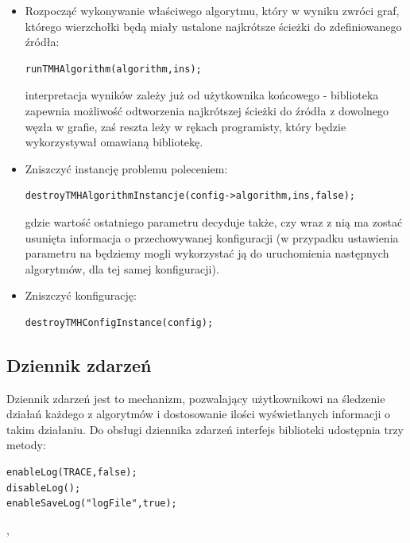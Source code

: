 \begin{itemize}
\item Rozpocząć wykonywanie właściwego algorytmu, który w wyniku zwróci graf, którego wierzchołki będą miały ustalone najkrótsze ścieżki do zdefiniowanego źródła:
\begin{lstlisting}[style=customc]
runTMHAlgorithm(algorithm,ins);
\end{lstlisting}
interpretacja wyników zależy już od użytkownika końcowego - biblioteka zapewnia możliwość odtworzenia najkrótszej ścieżki do źródła z dowolnego węzła w grafie, zaś reszta leży w rękach programisty, który będzie wykorzystywał omawianą bibliotekę.
\item Zniszczyć instancję problemu poleceniem:
\begin{lstlisting}[style=customc]
destroyTMHAlgorithmInstancje(config->algorithm,ins,false);
\end{lstlisting}
gdzie wartość ostatniego parametru decyduje także, czy wraz z nią ma zostać usunięta informacja o przechowywanej konfiguracji (w przypadku ustawienia parametru na \KwFalse będziemy mogli wykorzystać ją do uruchomienia następnych algorytmów, dla tej samej konfiguracji).
\item Zniszczyć konfigurację:
\begin{lstlisting}[style=customc]
destroyTMHConfigInstance(config);
\end{lstlisting}
\end{itemize}

\subsection{Dziennik zdarzeń}

Dziennik zdarzeń jest to mechanizm, pozwalający użytkownikowi na śledzenie działań każdego z algorytmów i dostosowanie ilości wyświetlanych informacji o takim działaniu. Do obsługi dziennika zdarzeń interfejs biblioteki udostępnia trzy metody:
\begin{lstlisting}[style=customc]
enableLog(TRACE,false);
disableLog();
enableSaveLog("logFile",true);
\end{lstlisting},

